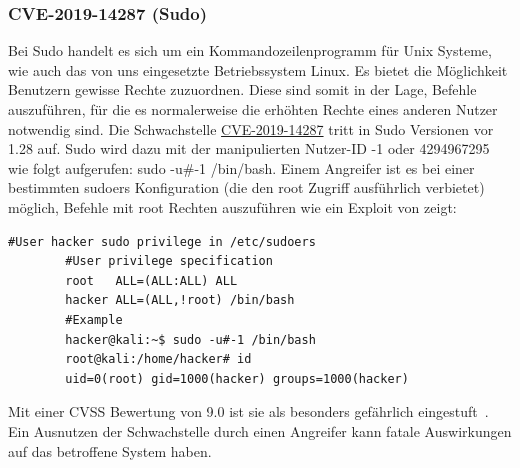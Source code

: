 \documentclass[10pt, a4paper,onecolumn ,titlepage]{article}
\begin{document}
    \subsubsection{CVE-2019-14287 (Sudo)}
    \label{subsubsec:sudo}
    Bei Sudo handelt es sich um ein Kommandozeilenprogramm für Unix Systeme, wie auch das von uns eingesetzte Betriebssystem Linux.
    Es bietet die Möglichkeit Benutzern gewisse Rechte zuzuordnen.
    Diese sind somit in der Lage, Befehle auszuführen, für die es normalerweise die erhöhten Rechte eines anderen Nutzer notwendig sind.
    Die Schwachstelle \href{https://www.cvedetails.com/cve/CVE-2019-14287/?q=CVE-2019-14287}{CVE-2019-14287} tritt in Sudo Versionen vor 1.28 auf.
    Sudo wird dazu mit der manipulierten Nutzer-ID -1 oder 4294967295 wie folgt aufgerufen: sudo -u\#-1 /bin/bash.
    Einem Angreifer ist es bei einer bestimmten sudoers Konfiguration (die den root Zugriff ausführlich verbietet) möglich, Befehle mit root Rechten auszuführen wie ein Exploit von \textcite{privilegeEscalationSudoExploit} zeigt:
    \vspace{0.5cm}
    \begin{lstlisting}[label={lst:examplesudo}]
        #User hacker sudo privilege in /etc/sudoers
        #User privilege specification
        root   ALL=(ALL:ALL) ALL
        hacker ALL=(ALL,!root) /bin/bash
        #Example
        hacker@kali:~$ sudo -u#-1 /bin/bash
        root@kali:/home/hacker# id
        uid=0(root) gid=1000(hacker) groups=1000(hacker)
    \end{lstlisting}
    \vspace{0.5}
    Mit einer CVSS Bewertung von 9.0 ist sie als besonders gefährlich eingestuft~\parencite{privilegeEscalationSudo}.
    Ein Ausnutzen der Schwachstelle durch einen Angreifer kann fatale Auswirkungen auf das betroffene System haben.
\end{document}
